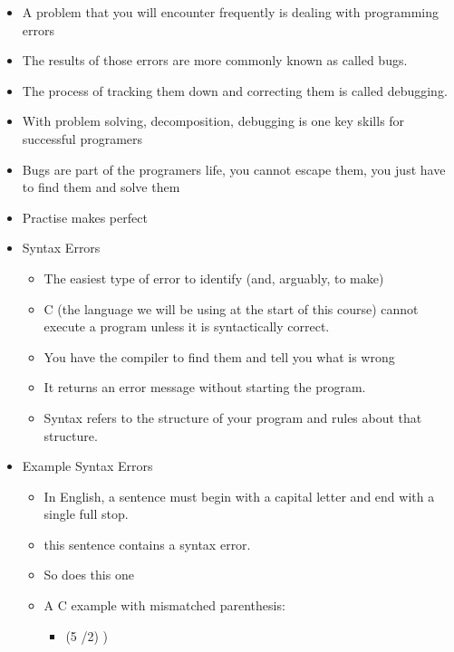 \documentclass{beamer}
\begin{document}
\begin{frame}
\begin{itemize}
\item A problem that you will encounter frequently is dealing with programming errors 
\item The results of those errors are more commonly known as called \textcolor[rgb]{0.26666668,0.0,0.5176471}{bugs}. 
\item The process of tracking them down and correcting them is called
\textcolor[rgb]{0.26666668,0.0,0.5176471}{debugging}. 
\item With problem solving, decomposition, \textcolor[rgb]{0.26666668,0.0,0.5176471}{debugging }is one key skills for
successful programers 
\item Bugs are part of the programers life, you cannot escape them, you just have to find them and solve them 
\item Practise makes perfect 
\end{itemize}
\end{frame}

\begin{frame}
\begin{itemize}
\item Syntax Errors
\begin{itemize}
\item The easiest type of error to identify (and, arguably, to make) 
\item C (the language we will be using at the start of this course) cannot execute a program unless it is syntactically correct. 
\item You have the compiler to find them and tell you what is wrong 
\item It returns an error message without starting the program. 
\item Syntax refers to the structure of your program and rules about that structure. 
\end{itemize}
\end{itemize}
\end{frame}

\begin{frame}
\begin{itemize}
\item Example Syntax Errors 
\begin{itemize}
\item In English, a sentence must begin with a capital letter and end with a single full stop. 
\item this sentence contains a syntax error. 
\item So does this one \textcolor[rgb]{0.3372549,0.0,0.64705884}{\ }
\item A C example with mismatched parenthesis: 
\begin{itemize}
\item (5 /2) ) 
\end{itemize}
\end{itemize}
\end{itemize}
\end{frame}
\end{document}
